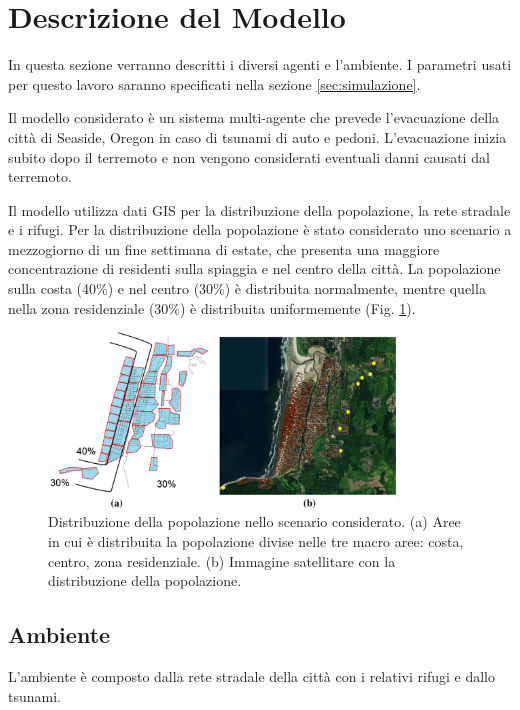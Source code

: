 \section{Descrizione del Modello}
\label{sec:modello}
In questa sezione verranno descritti i diversi agenti e l'ambiente.
I parametri usati per questo lavoro saranno specificati nella sezione \ref{sec:simulazione}.

Il modello considerato \parencite{mostafizi2016agent} è un sistema multi-agente che prevede l'evacuazione della città di Seaside, Oregon in caso di tsunami di auto e pedoni.
%
L'evacuazione inizia subito dopo il terremoto e non vengono considerati eventuali danni causati dal terremoto.

\pagebreak

Il modello utilizza dati GIS per la distribuzione della popolazione, la rete stradale e i rifugi.
%
Per la distribuzione della popolazione è stato considerato uno scenario a mezzogiorno di un fine settimana di estate,
che presenta una maggiore concentrazione di residenti sulla spiaggia e nel centro della città.
La popolazione sulla costa (40\%) e nel centro (30\%) è distribuita normalmente,
mentre quella nella zona residenziale (30\%) è distribuita uniformemente (Fig. \ref{fig:population}).

\begin{figure}[ht]
  \centering
  \includegraphics[width=0.82\textwidth]{images/population}
  \caption{Distribuzione della popolazione nello scenario considerato.
    (a) Aree in cui è distribuita la popolazione divise nelle tre macro aree: costa, centro, zona residenziale.
    (b) Immagine satellitare con la distribuzione della popolazione.}
  \label{fig:population}
\end{figure}

\subsection{Ambiente}
L'ambiente è composto dalla rete stradale della città con i relativi rifugi e dallo tsunami.

